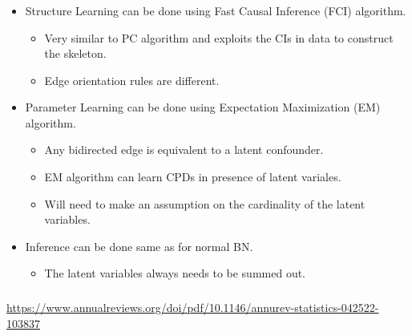 \documentclass{beamer}
\begin{document}
\begin{frame}
	\frametitle{}
	\begin{itemize}
		\item Structure Learning can be done using Fast Causal Inference (FCI) algorithm.
			\begin{itemize}
				\item Very similar to PC algorithm and exploits the CIs in data to construct the skeleton.
				\item Edge orientation rules are different.
			\end{itemize}
		\item Parameter Learning can be done using Expectation Maximization (EM) algorithm.
			\begin{itemize}
				\item Any bidirected edge is equivalent to a latent confounder.
				\item EM algorithm can learn CPDs in presence of latent variales.
				\item Will need to make an assumption on the cardinality of the latent variables.
			\end{itemize}
		\item Inference can be done same as for normal BN.
			\begin{itemize}
				\item The latent variables always needs to be summed out.
			\end{itemize}
	\end{itemize}
\end{frame}

\begin{frame}
	\frametitle{}
	\url{https://www.annualreviews.org/doi/pdf/10.1146/annurev-statistics-042522-103837}
\end{frame}
\end{document}
